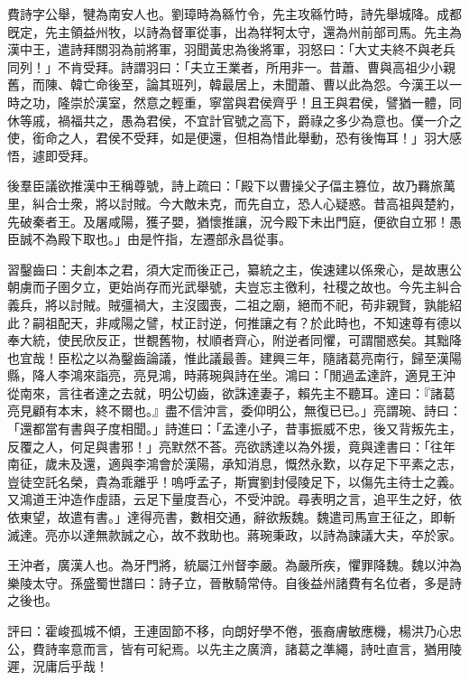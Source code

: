 
\begin{pinyinscope}
費詩字公舉，犍為南安人也。劉璋時為緜竹令，先主攻緜竹時，詩先舉城降。成都旣定，先主領益州牧，以詩為督軍從事，出為䍧牱太守，還為州前部司馬。先主為漢中王，遣詩拜關羽為前將軍，羽聞黃忠為後將軍，羽怒曰：「大丈夫終不與老兵同列！」不肯受拜。詩謂羽曰：「夫立王業者，所用非一。昔蕭、曹與高祖少小親舊，而陳、韓亡命後至，論其班列，韓最居上，未聞蕭、曹以此為怨。今漢王以一時之功，隆崇於漢室，然意之輕重，寧當與君侯齊乎！且王與君侯，譬猶一體，同休等戚，禍福共之，愚為君侯，不宜計官號之高下，爵祿之多少為意也。僕一介之使，銜命之人，君侯不受拜，如是便還，但相為惜此舉動，恐有後悔耳！」羽大感悟，遽即受拜。

後羣臣議欲推漢中王稱尊號，詩上疏曰：「殿下以曹操父子偪主篡位，故乃羇旅萬里，糾合士衆，將以討賊。今大敵未克，而先自立，恐人心疑惑。昔高祖與楚約，先破秦者王。及屠咸陽，獲子嬰，猶懷推讓，況今殿下未出門庭，便欲自立邪！愚臣誠不為殿下取也。」由是忤指，左遷部永昌從事。

習鑿齒曰：夫創本之君，須大定而後正己，纂統之主，俟速建以係衆心，是故惠公朝虜而子圉夕立，更始尚存而光武舉號，夫豈忘主徼利，社稷之故也。今先主糾合義兵，將以討賊。賊彊禍大，主沒國喪，二祖之廟，絕而不祀，苟非親賢，孰能紹此？嗣祖配天，非咸陽之譬，杖正討逆，何推讓之有？於此時也，不知速尊有德以奉大統，使民欣反正，世覩舊物，杖順者齊心，附逆者同懼，可謂闇惑矣。其黜降也宜哉！臣松之以為鑿齒論議，惟此議最善。建興三年，隨諸葛亮南行，歸至漢陽縣，降人李鴻來詣亮，亮見鴻，時蔣琬與詩在坐。鴻曰：「閒過孟達許，適見王沖從南來，言往者達之去就，明公切齒，欲誅達妻子，賴先主不聽耳。達曰：『諸葛亮見顧有本末，終不爾也。』盡不信沖言，委仰明公，無復已已。」亮謂琬、詩曰：「還都當有書與子度相聞。」詩進曰：「孟達小子，昔事振威不忠，後又背叛先主，反覆之人，何足與書邪！」亮默然不荅。亮欲誘達以為外援，竟與達書曰：「往年南征，歲未及還，適與李鴻會於漢陽，承知消息，慨然永歎，以存足下平素之志，豈徒空託名榮，貴為乖離乎！嗚呼孟子，斯實劉封侵陵足下，以傷先主待士之義。又鴻道王沖造作虛語，云足下量度吾心，不受沖說。尋表明之言，追平生之好，依依東望，故遣有書。」達得亮書，數相交通，辭欲叛魏。魏遣司馬宣王征之，即斬滅達。亮亦以達無款誠之心，故不救助也。蔣琬秉政，以詩為諫議大夫，卒於家。

王沖者，廣漢人也。為牙門將，統屬江州督李嚴。為嚴所疾，懼罪降魏。魏以沖為樂陵太守。孫盛蜀世譜曰：詩子立，晉散騎常侍。自後益州諸費有名位者，多是詩之後也。

評曰：霍峻孤城不傾，王連固節不移，向朗好學不倦，張裔膚敏應機，楊洪乃心忠公，費詩率意而言，皆有可紀焉。以先主之廣濟，諸葛之準繩，詩吐直言，猶用陵遲，況庸后乎哉！


\end{pinyinscope}
